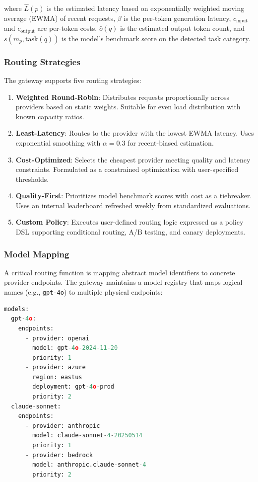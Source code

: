 \documentclass[11pt,twocolumn]{article}
\begin{document}
where $\hat{L}(p)$ is the estimated latency based on exponentially weighted moving average (EWMA) of recent requests, $\beta$ is the per-token generation latency, $c_{\text{input}}$ and $c_{\text{output}}$ are per-token costs, $\hat{o}(q)$ is the estimated output token count, and $s(m_p, \text{task}(q))$ is the model's benchmark score on the detected task category.

\subsubsection{Routing Strategies}

The gateway supports five routing strategies:

\begin{enumerate}[leftmargin=*]
    \item \textbf{Weighted Round-Robin}: Distributes requests proportionally across providers based on static weights. Suitable for even load distribution with known capacity ratios.
    \item \textbf{Least-Latency}: Routes to the provider with the lowest EWMA latency. Uses exponential smoothing with $\alpha = 0.3$ for recent-biased estimation.
    \item \textbf{Cost-Optimized}: Selects the cheapest provider meeting quality and latency constraints. Formulated as a constrained optimization with user-specified thresholds.
    \item \textbf{Quality-First}: Prioritizes model benchmark scores with cost as a tiebreaker. Uses an internal leaderboard refreshed weekly from standardized evaluations.
    \item \textbf{Custom Policy}: Executes user-defined routing logic expressed as a policy DSL supporting conditional routing, A/B testing, and canary deployments.
\end{enumerate}

\subsubsection{Model Mapping}

A critical routing function is mapping abstract model identifiers to concrete provider endpoints. The gateway maintains a model registry that maps logical names (e.g., \texttt{gpt-4o}) to multiple physical endpoints:

\begin{lstlisting}[language=Python, caption=Model mapping configuration]
models:
  gpt-4o:
    endpoints:
      - provider: openai
        model: gpt-4o-2024-11-20
        priority: 1
      - provider: azure
        region: eastus
        deployment: gpt-4o-prod
        priority: 2
  claude-sonnet:
    endpoints:
      - provider: anthropic
        model: claude-sonnet-4-20250514
        priority: 1
      - provider: bedrock
        model: anthropic.claude-sonnet-4
        priority: 2
\end{lstlisting}
\end{document}
